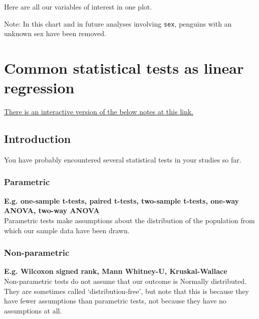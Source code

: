\documentclass[
  openany]{book}
\begin{document}
Here are all our variables of interest in one plot.

Note: In this chart and in future analyses involving \texttt{sex}, penguins with an unknown sex have been removed.

\hypertarget{common-statistical-tests-as-linear-regression}{%
\section{Common statistical tests as linear regression}\label{common-statistical-tests-as-linear-regression}}

\href{https://jupyter.utoronto.ca/hub/user-redirect/git-pull?repo=https\%3A\%2F\%2Fgithub.com\%2Fsta303-bolton\%2Fsta303_activities\&urlpath=shiny\%2Fsta303_activities\%2Finst\%2Ftutorials\%2Fsta303_w1_tests\%2F\&branch=main}{There is an interactive version of the below notes at this link.}

\hypertarget{introduction}{%
\subsection{Introduction}\label{introduction}}

You have probably encountered several statistical tests in your studies so far.

\hypertarget{parametric}{%
\subsubsection{Parametric}\label{parametric}}

\textbf{E.g. one-sample t-tests, paired t-tests, two-sample t-tests, one-way ANOVA, two-way ANOVA}\\
Parametric tests make assumptions about the distribution of the population from which our sample data have been drawn.

\hypertarget{non-parametric}{%
\subsubsection{Non-parametric}\label{non-parametric}}

\textbf{E.g. Wilcoxon signed rank, Mann Whitney-U, Kruskal-Wallace}\\
Non-parametric tests do not assume that our outcome is Normally distributed. They are sometimes called `distribution-free', but note that this is because they have fewer assumptions than parametric tests, not because they have no assumptions at all.
\end{document}
